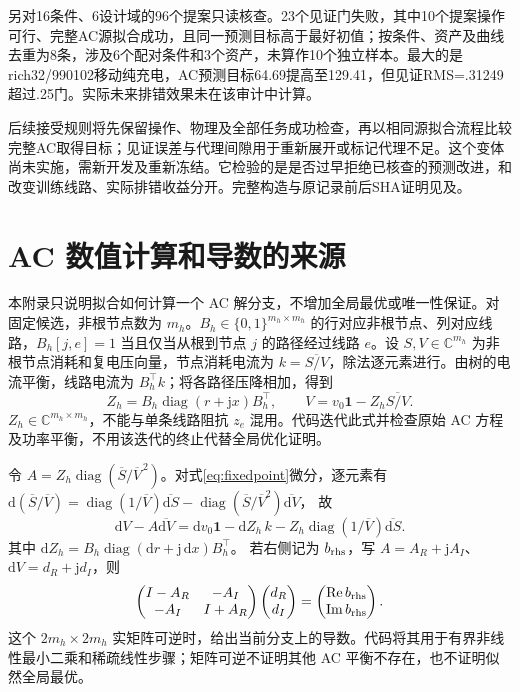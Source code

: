 \documentclass[UTF8,fontset=fandol,11pt,a4paper]{ctexart}
\begin{document}
另对16条件、6设计域的96个提案只读核查。23个见证门失败，其中10个提案操作可行、完整AC源拟合成功，且同一预测目标高于最好初值；按条件、资产及曲线去重为8条，涉及6个配对条件和3个资产，未算作10个独立样本。最大的是rich32/990102移动纯充电，AC预测目标64.69提高至129.41，但见证RMS=.31249超过.25门。实际未来排错效果未在该审计中计算。

后续接受规则将先保留操作、物理及全部任务成功检查，再以相同源拟合流程比较完整AC取得目标；见证误差与代理间隙用于重新展开或标记代理不足。这个变体尚未实施，需新开发及重新冻结。它检验的是是否过早拒绝已核查的预测改进，和改变训练线路、实际排错收益分开。完整构造与原记录前后SHA证明见及。



\appendix
\section{AC 数值计算和导数的来源}
\label{sec:jacobian}
本附录只说明拟合如何计算一个 AC 解分支，不增加全局最优或唯一性保证。对固定候选，非根节点数为 $m_h$。$B_h\in\{0,1\}^{m_h\times m_h}$ 的行对应非根节点、列对应线路，$B_h[j,e]=1$ 当且仅当从根到节点 $j$ 的路径经过线路 $e$。设 $S,V\in\mathbb C^{m_h}$ 为非根节点消耗和复电压向量，节点消耗电流为 $k=\overline{S/V}$，除法逐元素进行。由树的电流平衡，线路电流为 $B_h^\top k$；将各路径压降相加，得到
\begin{equation}
 Z_h=B_h\operatorname{diag}(r+\mathrm jx)B_h^\top,\qquad
 V=v_0\mathbf1-Z_h\overline{S/V}.
 \label{eq:fixedpoint}
\end{equation}
$Z_h\in\mathbb C^{m_h\times m_h}$，不能与单条线路阻抗 $z_e$ 混用。代码迭代此式并检查原始 AC 方程及功率平衡，不用该迭代的终止代替全局优化证明。

令 $A=Z_h\operatorname{diag}(\overline S/\overline V^{\,2})$。对式\eqref{eq:fixedpoint}微分，逐元素有
$\mathrm d(\overline S/\overline V)
=\operatorname{diag}(1/\overline V)\overline{\mathrm dS}
-\operatorname{diag}(\overline S/\overline V^2)\overline{\mathrm dV}$，
故
\begin{equation}
 \mathrm dV-A\overline{\mathrm dV}
 =\mathrm dv_0\mathbf1-\mathrm dZ_h\,k
    -Z_h\operatorname{diag}(1/\overline V)\overline{\mathrm dS}.
 \label{eq:derivative}
\end{equation}
其中 $\mathrm dZ_h=B_h\operatorname{diag}(\mathrm dr+\mathrm j\,\mathrm dx)B_h^\top$。
若右侧记为 $b_{\rm rhs}$，写 $A=A_R+\mathrm jA_I$、
$\mathrm dV=d_R+\mathrm jd_I$，则
\[
 \begin{pmatrix}I-A_R&-A_I\\-A_I&I+A_R\end{pmatrix}
 \begin{pmatrix}d_R\\d_I\end{pmatrix}
 =\begin{pmatrix}\operatorname{Re}b_{\rm rhs}\\
                  \operatorname{Im}b_{\rm rhs}\end{pmatrix}.
\]
这个 $2m_h\times2m_h$ 实矩阵可逆时，给出当前分支上的导数。代码将其用于有界非线性最小二乘和稀疏线性步骤；矩阵可逆不证明其他 AC 平衡不存在，也不证明似然全局最优。
\end{document}
